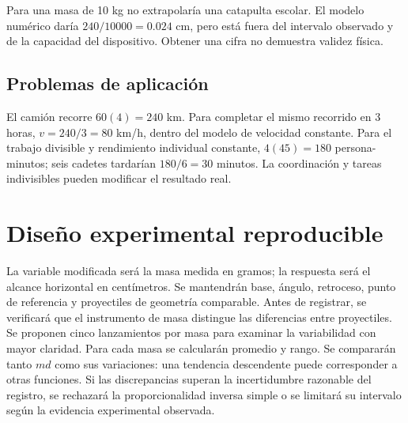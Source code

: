 \documentclass[spanish,letterpaper,oneside]{article}
\begin{document}
\begin{center}
\end{center}
Para una masa de 10 kg no extrapolaría una catapulta escolar. El modelo numérico daría $240/10000=0.024$ cm, pero está fuera del intervalo observado y de la capacidad del dispositivo. Obtener una cifra no demuestra validez física.
\subsection*{Problemas de aplicación}
El camión recorre $60(4)=240$ km. Para completar el mismo recorrido en 3 horas, $v=240/3=80$ km/h, dentro del modelo de velocidad constante. Para el trabajo divisible y rendimiento individual constante, $4(45)=180$ persona-minutos; seis cadetes tardarían $180/6=30$ minutos. La coordinación y tareas indivisibles pueden modificar el resultado real.
\section{Diseño experimental reproducible}
La variable modificada será la masa medida en gramos; la respuesta será el alcance horizontal en centímetros. Se mantendrán base, ángulo, retroceso, punto de referencia y proyectiles de geometría comparable. Antes de registrar, se verificará que el instrumento de masa distingue las diferencias entre proyectiles. Se proponen cinco lanzamientos por masa para examinar la variabilidad con mayor claridad.
Para cada masa se calcularán promedio y rango. Se compararán tanto $md$ como sus variaciones: una tendencia descendente puede corresponder a otras funciones. Si las discrepancias superan la incertidumbre razonable del registro, se rechazará la proporcionalidad inversa simple o se limitará su intervalo según la evidencia experimental observada.
\end{document}
